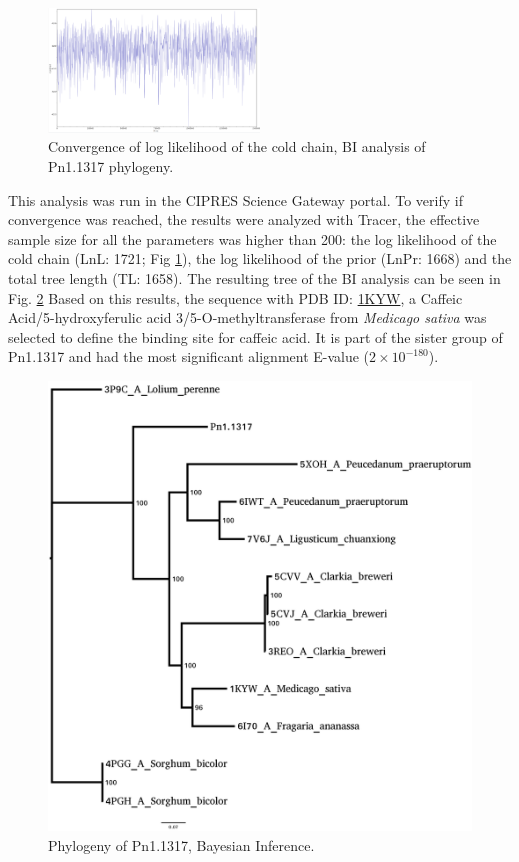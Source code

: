 \documentclass[12pt]{article}
\begin{document}
	\FloatBarrier
	\begin{figure}
		\centering
		\includegraphics[width=0.5\textwidth]{../4/Phylogeny/trace.png}
		\caption[Convergence of lnL, BI analysis of Pn1.1317.]{\centering Convergence of log likelihood of the cold chain, BI analysis of Pn1.1317 phylogeny.}
		\label{fig4_4}
	\end{figure}
	\FloatBarrier


	This analysis was run in the CIPRES Science Gateway portal. \cite{cipres} To verify if convergence was reached, the results were analyzed with Tracer, the effective sample size for all the parameters was higher than 200: the log likelihood of the
	cold chain (LnL: 1721; Fig \ref{fig4_4}), the log likelihood of the prior (LnPr: 1668) and the total tree length (TL: 1658). \cite{tracer}
	The resulting tree of the BI analysis can be seen in Fig. \ref{fig4_5} Based on this results, the sequence with PDB ID: \href{https://www.rcsb.org/structure/1KYW}{1KYW}, a Caffeic Acid/5-hydroxyferulic acid 3/5-O-methyltransferase from \textit{Medicago sativa} was selected to define the binding site for caffeic acid. It is part of the sister group of Pn1.1317 and had the most significant alignment E-value ($2\times10^{-180}$). 
	

	\FloatBarrier
	\begin{figure}
		\centering
		\includegraphics[width=0.5\textwidth-10pt]{../4/Phylogeny/tree.png}
		\caption{\centering Phylogeny of Pn1.1317, Bayesian Inference.}
		\label{fig4_5}
	\end{figure}
	\FloatBarrier
	
\end{document}
